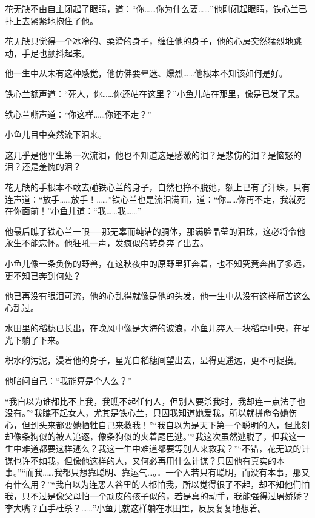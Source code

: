 \documentclass[12pt,oneside]{book}
\begin{document}
花无缺不由自主闭起了眼睛，道：``你\ldots\ldots 你为什么要\ldots\ldots{}''他刚闭起眼睛，铁心兰已扑上去紧紧地抱住了他。

花无缺只觉得一个冰冷的、柔滑的身子，缠住他的身子，他的心房突然猛烈地跳动，手足也颤抖起来。

他一生中从未有这种感觉，他仿佛要晕迷、爆烈\ldots\ldots 他根本不知该如何是好。

铁心兰额声道：``死人，你\ldots\ldots 你还站在这里？''小鱼儿站在那里，像是已发了呆。

铁心兰嘶声道：``你这样\ldots\ldots 你还不走？''

小鱼儿目中突然流下泪来。

这几乎是他平生第一次流泪，他也不知道这是感激的泪？是悲伤的泪？是恼怒的泪？还是羞愧的泪？

花无缺的手根本不敢去碰铁心兰的身子，自然也挣不脱她，额上已有了汗珠，只有连声道：``放手\ldots\ldots 放手！\ldots\ldots{}''铁心兰也是流泪满面，道：``你\ldots\ldots 你再不走，我就死在你面前！''小鱼儿道：``我\ldots\ldots 我\ldots\ldots{}''

他最后瞧了铁心兰一眼──那无辜而纯洁的胴体，那满脸晶莹的泪珠，这必将令他永生不能忘怀。他狂吼一声，发疯似的转身奔了出去。

小鱼儿像一条负伤的野兽，在这秋夜中的原野里狂奔着，也不知究竟奔出了多远，更不知已奔到何处？

他已再没有眼泪可流，他的心乱得就像是他的头发，他一生中从没有这样痛苦这么心乱过。

水田里的稻穗已长出，在晚风中像是大海的波浪，小鱼儿奔入一块稻草中央，在星光下躺了下来。

积水的污泥，浸着他的身子，星光自稻穗间望出去，显得更遥远，更不可捉摸。

他暗问自己：``我能算是个人么？''

``我自以为谁都比不上我，我瞧不起任何人，但别人要杀我时，我却连一点法子也没有。''``我瞧不起女人，尤其是铁心兰，只因我知道她爱我，所以就拼命令她伤心，但到头来都要她牺牲自己来救我！''``我自以为是天下第一个聪明的人，但此刻却像条狗似的被人追逐，像条狗似的夹着尾巴逃。''``我这次虽然逃脱了，但我这一生中难道都要这样逃么？我这一生中难道都要等别人来救我？''``不错，花无缺的计谋也许不如我，但像他这样的人，又何必再用什么计谋？只因他有真实的本事。''``而我\ldots\ldots 我都只想靠聪明、靠运气\ldots。．一个人若只有聪明，而没有本事，那又有什么用？''``我自以为连恶人谷里的人都怕我，所以觉得很了不起，却不知他们怕我，只不过是像父母怕一个顽皮的孩子似的，若是真的动手，我能强得过屠娇娇？李大嘴？血手杜杀？\ldots\ldots{}''小鱼儿就这样躺在水田里，反反复复地想着。
\end{document}
